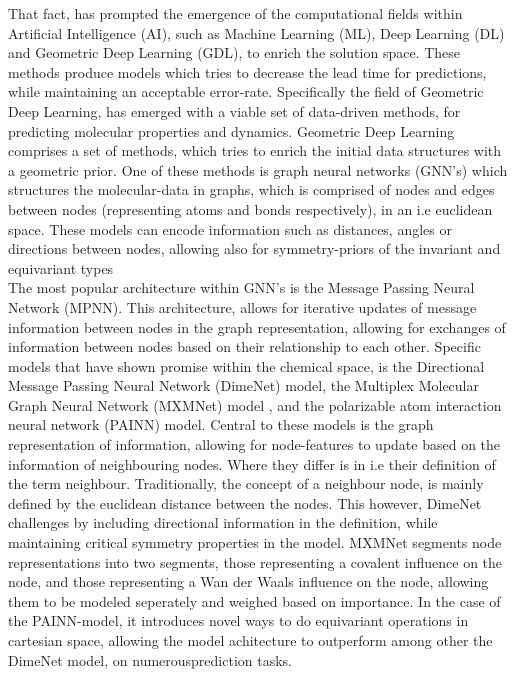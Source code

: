 That fact, has prompted the emergence of the computational fields within Artificial Intelligence (AI), such as Machine Learning (ML),
Deep Learning (DL) and Geometric Deep Learning (GDL), to enrich the solution space. These methods produce models which tries to
decrease the lead time for predictions, while maintaining an acceptable error-rate\cite{Gasteiger2020}. Specifically the field
of Geometric Deep Learning, has emerged with a viable set of data-driven methods, for predicting molecular properties and
dynamics\cite{Atz2021}. Geometric Deep Learning comprises a set of methods, which tries to enrich the initial data structures
with a geometric prior. One of these methods is graph neural networks (GNN's) which structures the molecular-data in graphs,
which is comprised of nodes and edges between nodes (representing atoms and bonds respectively), in an i.e euclidean space\cite{Atz2021}.
These models can encode information such as distances, angles or directions between nodes, allowing also for symmetry-priors of the invariant and
equivariant types\cite{Unke2021}\\ The most popular architecture within GNN's is the Message Passing Neural Network (MPNN)\cite{Atz2021}.
This architecture, allows for iterative updates of message information between nodes in the graph representation, allowing for
exchanges of information between nodes based on their relationship to each other.
Specific models that have shown promise within the chemical space, is the
Directional Message Passing Neural Network (DimeNet) model\cite{Gasteiger2020}, the Multiplex Molecular Graph Neural Network (MXMNet)
model \cite{Zhang2020}, and the polarizable atom interaction neural network (PAINN) model\cite{PAINN}.
Central to these models is the graph representation of information, allowing
for node-features to update based on the information of neighbouring nodes. Where they differ is in i.e their definition of the term
neighbour.
Traditionally, the concept of a neighbour node, is mainly defined by the euclidean distance between the nodes\cite{Zhou2018}.
This however, DimeNet challenges by including directional information in the definition, while maintaining critical symmetry properties in the model.
MXMNet segments node representations into two segments, those representing a covalent influence on the node, and those representing
a Wan der Waals influence on the node, allowing them to be modeled seperately and weighed based on importance\cite{Zhang2020}. In the case
of the PAINN-model, it introduces novel ways to do equivariant operations in cartesian space, allowing the model achitecture to outperform
among other the DimeNet model, on numerousprediction tasks. \\

